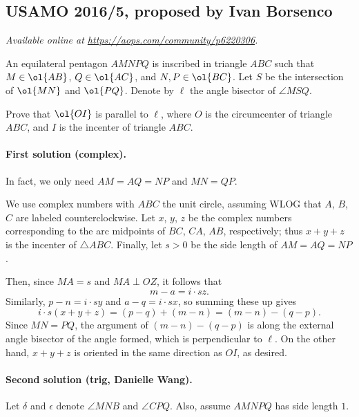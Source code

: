 \documentclass[11pt]{scrartcl}
\begin{document}
\subsection{USAMO 2016/5, proposed by Ivan Borsenco}
\textsl{Available online at \url{https://aops.com/community/p6220306}.}
\begin{mdframed}[style=mdpurplebox,frametitle={Problem statement}]
An equilateral pentagon $AMNPQ$ is inscribed in triangle $ABC$
such that $M \in \ol{AB}$, $Q \in \ol {AC}$, and $N,P \in \ol{BC}$.
Let $S$ be the intersection of $\ol{MN}$ and $\ol{PQ}$.
Denote by $\ell$ the angle bisector of $\angle MSQ$.

Prove that $\ol{OI}$ is parallel to $\ell$,
where $O$ is the circumcenter of triangle $ABC$,
and $I$ is the incenter of triangle $ABC$.
\end{mdframed}
\paragraph{First solution (complex).}
In fact, we only need $AM = AQ = NP$ and $MN = QP$.

We use complex numbers with $ABC$ the unit circle,
assuming WLOG that $A$, $B$, $C$ are labeled counterclockwise.
Let $x$, $y$, $z$ be the complex numbers corresponding to the arc midpoints
of $BC$, $CA$, $AB$, respectively; thus $x+y+z$ is the incenter of $\triangle ABC$.
Finally, let $s > 0$ be the side length of $AM = AQ = NP$.

Then, since $MA = s$ and $MA \perp OZ$, it follows that
\[ m - a = i \cdot sz. \]
Similarly, $p-n = i \cdot sy$ and $a-q = i \cdot sx$, so summing these up gives
\[ i \cdot s(x+y+z) = (p-q) + (m-n) = (m-n) - (q-p). \]
Since $MN = PQ$, the argument of $(m-n) - (q-p)$ is along
the external angle bisector of the angle formed, which is perpendicular to $\ell$.
On the other hand, $x+y+z$ is oriented in the same direction as $OI$, as desired.

\paragraph{Second solution (trig, Danielle Wang).}
Let $\delta$ and $\epsilon$ denote $\angle MNB$ and $\angle CPQ$.
Also, assume $AMNPQ$ has side length $1$.
\end{document}
